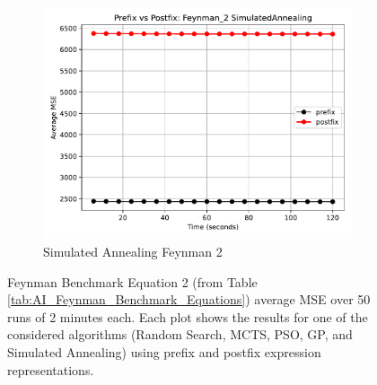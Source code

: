 \documentclass[runningheads]{llncs}
\begin{document}
\begin{figure}
    \vspace{0.5cm}
    
    \begin{subfigure}[b]{0.4\textwidth}
        \includegraphics[width=\linewidth, keepaspectratio]{AIFeynman_Benchmarks/PrePostFeynman_2SimulatedAnnealing.pdf}
        \caption{Simulated Annealing Feynman 2}
        \label{subfig:feynman_2_SA}
    \end{subfigure}
    
    \caption{Feynman Benchmark Equation 2 (from Table \ref{tab:AI_Feynman_Benchmark_Equations}) average MSE over 50 runs of 2 minutes each. Each plot shows the results for one of the considered algorithms (Random Search, MCTS, PSO, GP, and Simulated Annealing) using prefix and postfix expression representations.}
    \label{fig:AIFeynman_2_Benchmarks}
\end{figure}
\end{document}
